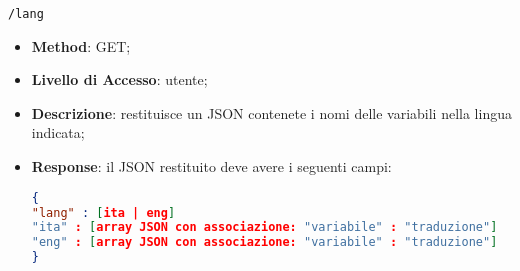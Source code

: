	\item \texttt{/lang}
		\begin{itemize}
			\item \textbf{Method}: GET;
			\item \textbf{Livello di Accesso}: utente;
			\item \textbf{Descrizione}: restituisce un JSON contenete i nomi delle variabili nella lingua indicata;
			\item \textbf{Response}: il JSON restituito deve avere i seguenti campi:
\begin{lstlisting}[language=json,firstnumber=1]
{
"lang" : [ita | eng]
"ita" : [array JSON con associazione: "variabile" : "traduzione"]
"eng" : [array JSON con associazione: "variabile" : "traduzione"]
}
\end{lstlisting}
		\end{itemize}